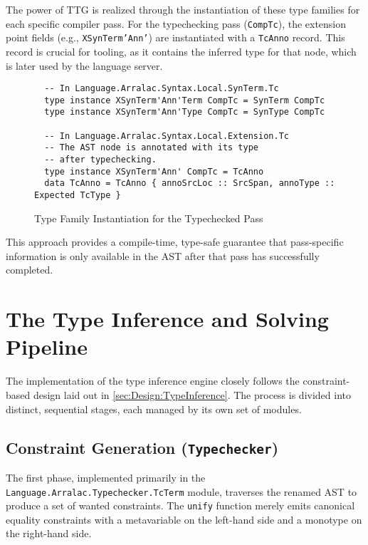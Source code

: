 The power of TTG is realized through the instantiation of these type families for each specific compiler pass. For the typechecking pass (\texttt{CompTc}), the extension point fields (e.g., \texttt{XSynTerm'Ann'}) are instantiated with a \texttt{TcAnno} record. This record is crucial for tooling, as it contains the inferred type for that node, which is later used by the language server.

\begin{figure}
    \centering
    \begin{verbatim}
  -- In Language.Arralac.Syntax.Local.SynTerm.Tc
  type instance XSynTerm'Ann'Term CompTc = SynTerm CompTc
  type instance XSynTerm'Ann'Type CompTc = SynType CompTc

  -- In Language.Arralac.Syntax.Local.Extension.Tc
  -- The AST node is annotated with its type 
  -- after typechecking.
  type instance XSynTerm'Ann' CompTc = TcAnno
  data TcAnno = TcAnno { annoSrcLoc :: SrcSpan, annoType :: Expected TcType }
  \end{verbatim}
    \caption{Type Family Instantiation for the Typechecked Pass}
\end{figure}

This approach provides a compile-time, type-safe guarantee that pass-specific information is only available in the AST after that pass has successfully completed.

\section{The Type Inference and Solving Pipeline}
\label{sec:Implementation:Pipeline}

The implementation of the type inference engine closely follows the constraint-based design laid out in \cref{sec:Design:TypeInference}. The process is divided into distinct, sequential stages, each managed by its own set of modules.

\subsection{Constraint Generation (\texttt{Typechecker})}
The first phase, implemented primarily in the \\ \texttt{Language.Arralac.Typechecker.TcTerm} module, traverses the renamed AST to produce a set of wanted constraints. The \texttt{unify} function merely emits canonical equality constraints with a metavariable on the left-hand side and a monotype on the right-hand side.

